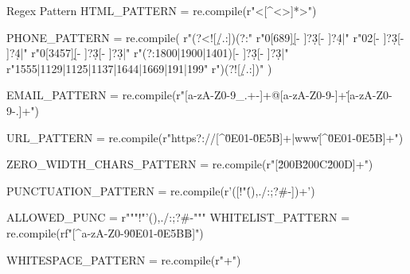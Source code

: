 \documentclass[12pt, a4paper]{article}
\begin{document}
    \pagebreak

                \begin{codeblock}{Regex Pattern}
                    HTML_PATTERN = re.compile(r"<[^<>]*>")

                    PHONE_PATTERN = re.compile(
                        r"(?<![\d/.:])(?:"
                        r"0[689]\d[- ]?\d{3}[- ]?\d{4}|"
                        r"02[- ]?\d{3}[- ]?\d{4}|"
                        r"0[3457]\d[- ]?\d{3}[- ]?\d{3}|"
                        r"(?:1800|1900|1401)[- ]?\d{3}[- ]?\d{3}|"
                        r"1555|1129|1125|1137|1644|1669|191|199"
                        r")(?![\d/.:])"
                    )

                    EMAIL_PATTERN = re.compile(r"[a-zA-Z0-9_.+-]+@[a-zA-Z0-9-]+\.[a-zA-Z0-9-.]+")

                    URL_PATTERN = re.compile(r"https?://[^\s\u0E01-\u0E5B]+|www\.[^\s\u0E01-\u0E5B]+")

                    ZERO_WIDTH_CHARS_PATTERN = re.compile(r"[\u200B\u200C\u200D\uFEFF]+")

                    PUNCTUATION_PATTERN = re.compile(r'([!"\'(),./:;?#-])\1+')

                    ALLOWED_PUNC = r"""!"'(),./:;?#-"""
                    WHITELIST_PATTERN = re.compile(rf"[^a-zA-Z0-9\u0E01-\u0E5B฿]")

                    WHITESPACE_PATTERN = re.compile(r"\s+")
                \end{codeblock}

    \pagebreak
\end{document}

